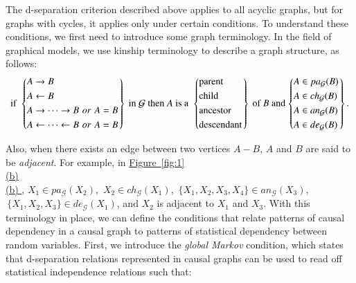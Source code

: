 \documentclass[twoside, 11pt]{article}
\newcommand*{\figref}[2][]{%
  \hyperref[{fig:#2}]{%
    Figure~\ref*{fig:#2}%
    \ifx\\#1\\%
    \else
      #1%
    \fi
  }%
}
\begin{document}
The d-separation criterion described above applies to all acyclic graphs, but for graphs with cycles, it applies only under certain conditions.
To understand these conditions, we first need to introduce some graph terminology. In the field of graphical models, we use kinship terminology to describe a graph structure, as follows:
\begin{equation*}
\text{if }
  \begin{rcases}
    \begin{dcases}
      A \rightarrow B \\
      A \leftarrow B \\
      A \rightarrow \cdots \rightarrow B \,\,or \,\,A = B \\
      A \leftarrow \cdots \leftarrow B \,\,or \,\,A = B
\end{dcases}
  \end{rcases}
  \text{ in } \mathcal{G} \text{ then } A \text{ is a }
  \begin{rcases}
    \begin{dcases}
      \text{parent} \\
      \text{child} \\
      \text{ancestor} \\
      \text{descendant}
\end{dcases}
  \end{rcases}
\text{ of } B \text{ and}
  \begin{rcases}
    \begin{dcases}
      A \in pa_{\mathcal{G}}(B) \\
      A \in ch_{\mathcal{G}}(B) \\
      A \in an_{\mathcal{G}}(B) \\
      A \in de_{\mathcal{G}}(B)
\end{dcases}
  \end{rcases}
\text{.}
\end{equation*}

\noindent Also, when there exists an edge between two vertices $A - B$, $A$ and $B$ are said to be \textit{adjacent}. For example, in \figref[(b)]{1}, $X_1 \in pa_{\mathcal{G}} (X_2)$, $\,X_2 \in ch_{\mathcal{G}} (X_1)$, $\,\{X_1, X_2, X_3, X_4\} \in an_{\mathcal{G}}(X_3)$, $\,\{X_1, X_2, X_3\} \in de_{\mathcal{G}} (X_1)$, and $X_2$ is adjacent to $X_1$ and $X_3$. With this terminology in place, we can define the conditions that relate patterns of causal dependency in a causal graph to patterns of statistical dependency between random variables. First, we introduce the \textit{global Markov} condition, which states that d-separation relations represented in causal graphs can be used to read off statistical independence relations such that:
\end{document}
